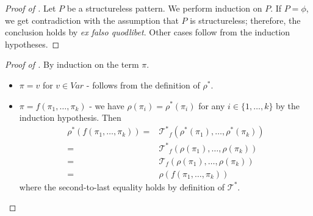 
\begin{proof}[Proof of ]
Let $P$ be a structureless pattern.
We perform induction on $P$.
If $P = \phi$, we get contradiction with the assumption that $P$ is structureless;
therefore, the conclusion holds by \emph{ex falso quodlibet}.
Other cases follow from the induction hypotheses.
\end{proof}


\begin{proof}[Proof of ]
    By induction on the term $\pi$.
    \begin{itemize}
        \item $\pi = v$ for $v \in \mathit{Var}$ - follows from the definition of $\rho^*$.
        \item $\pi = f(\pi_1, \ldots, \pi_k)$ - we have $\rho(\pi_i) = \rho^*(\pi_i)$ for any $i \in \{ 1, \ldots, k \}$
              by the induction hypothesis.
              Then
              \begin{align*}
                  \rho^*(f(\pi_1, \ldots, \pi_k)) 
                  = & {\mathcal{T}^*}_f(\rho^*(\pi_1), \ldots, \rho^*(\pi_k)) \\
                  = & {\mathcal{T}^*}_f(\rho(\pi_1), \ldots, \rho(\pi_k)) \\
                  = & \mathcal{T}_f(\rho(\pi_1), \ldots, \rho(\pi_k)) \\
                  = & \rho(f(\pi_1, \ldots, \pi_k))
              \end{align*}
              where the second-to-last equality holds by definition of $\mathcal{T}^*$.
    \end{itemize}
\end{proof}


